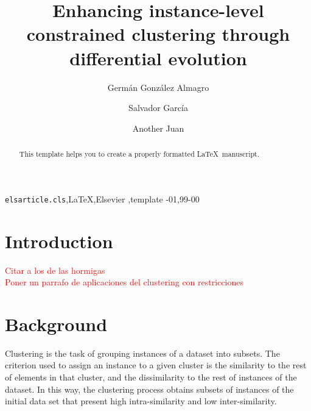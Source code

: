 \documentclass[review]{elsarticle}
\begin{document}
\begin{frontmatter}

\title{Enhancing instance-level constrained clustering through differential evolution}

\author[mymainaddress]{Germ\'an Gonz\'alez Almagro}

\author[mymainaddress]{Salvador Garc\'ia}

\author[mymainaddress]{Another Juan}

\address[mymainaddress]{Department of Computer Science and Artificial Intelligence, University of Granada, 18071 Granada, Spain}

\begin{abstract}
This template helps you to create a properly formatted \LaTeX\ manuscript.
\end{abstract}

\begin{keyword}
\texttt{elsarticle.cls}\sep \LaTeX\sep Elsevier \sep template
-01\sep  99-00
\end{keyword}

\end{frontmatter}

\linenumbers

\section{Introduction}

\textcolor{red}{Citar a los de las hormigas}\\
\textcolor{red}{Poner un parrafo de aplicaciones del clustering con restricciones}

\section{Background}


Clustering is the task of grouping instances of a dataset into subsets. The criterion used to assign an instance to a given cluster is the similarity to the rest of elements in that cluster, and the dissimilarity to the rest of instances of the dataset. In this way, the clustering process obtains subsets of instances of the initial data set that present high intra-similarity and low inter-similarity.
\end{document}
